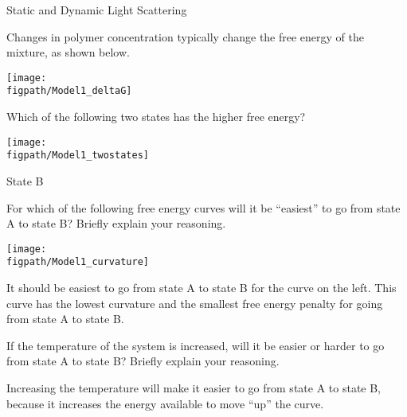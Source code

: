 \begin{activity}{Static and Dynamic Light Scattering}
\begin{ctqs}
\begin{solution}[1in]{}
		\end{solution}
	
\end{ctqs}

\begin{model}
	\label{\labelbase:mdl:SLS}

Changes in polymer concentration typically change the free energy of the mixture, as shown below.
	
	\centerline{\texttt{[image: \\figpath/Model1\_deltaG]}}
	
\end{model}

\begin{ctqs}
	
		\question Which of the following two states has the higher free energy?
	
	\vspace{6pt}
	\centerline{\texttt{[image: \\figpath/Model1\_twostates]}}
	
			\begin{solution}[0.25in]{}
				State B
			\end{solution}
			
		\question For which of the following free energy curves will it be ``easiest'' to go from state A to state B?  Briefly explain your reasoning.  \label{\labelbase:ctq:delGcurvature}
	
	\centerline{\texttt{[image: \\figpath/Model1\_curvature]}}
	
			\begin{solution}[1in]{}
				It should be easiest to go from state A to state B for the curve on the left.  This curve has the lowest curvature and the smallest free energy penalty for going from state A to state B.
			\end{solution}
			
	\question If the temperature of the system is increased, will it be easier or harder to go from state A to state B?  Briefly explain your reasoning. \label{\labelbase:ctq:temperature}
	
			\begin{solution}[1in]{}
				Increasing the temperature will make it easier to go from state A to state B, because it increases the energy available to move ``up'' the curve.
			\end{solution}
	
\end{ctqs}


\end{activity}
